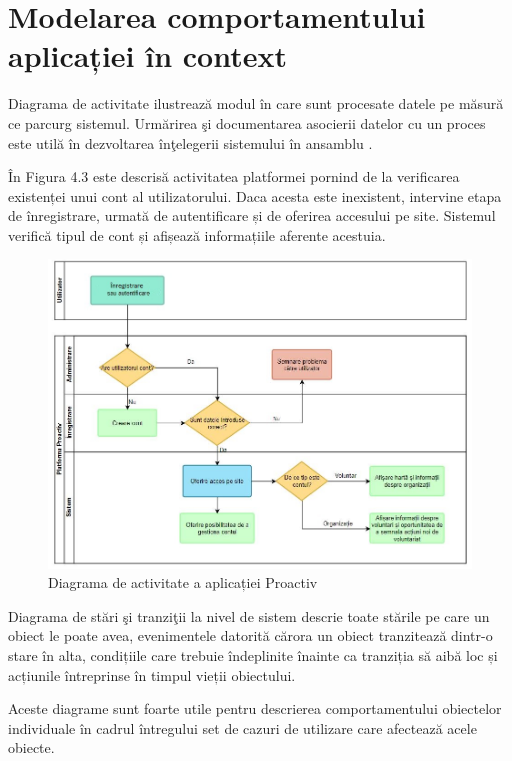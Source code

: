 \documentclass[12pt,a4paper]{report}
\begin{document}
\section{Modelarea comportamentului aplicației în context}
\par
Diagrama de activitate ilustrează modul în care sunt procesate datele pe măsură ce parcurg sistemul. Urmărirea şi documentarea asocierii datelor cu un proces este utilă în dezvoltarea înţelegerii sistemului în ansamblu \cite{uml}.
\\
\par
În Figura 4.3 este descrisă activitatea platformei pornind de la verificarea existenței unui cont al utilizatorului. Daca acesta este inexistent, intervine etapa de înregistrare, urmată de autentificare și de oferirea accesului pe site. Sistemul verifică tipul de cont și afișează informațiile aferente acestuia.
\\
\begin{figure}[h!]
\centering
  \includegraphics[width=1\linewidth]{./imagini/swimlane.JPG}
  \caption{Diagrama de activitate a aplicației Proactiv}
\end{figure}

\newpage
\par
Diagrama de stări şi tranziţii la nivel de sistem descrie toate stările pe care un obiect le poate avea, evenimentele datorită cărora un obiect tranzitează dintr-o stare în alta, condițiile care trebuie îndeplinite înainte ca tranziția să aibă loc și acțiunile întreprinse în timpul vieții obiectului.
\par
Aceste diagrame sunt foarte utile pentru descrierea comportamentului obiectelor individuale în cadrul întregului set de cazuri de utilizare care afectează acele obiecte.
\end{document}

